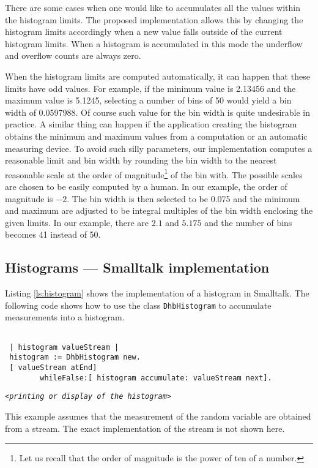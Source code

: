 \documentclass[twoside]{book}
\begin{document}
There are some cases when one would like to accumulates all the
values within the histogram limits. The proposed implementation
allows this by changing the histogram limits accordingly when a
new value falls outside of the current histogram limits. When a
histogram is accumulated in this mode the underflow and overflow
counts are always zero.

When the histogram limits are computed automatically, it can
happen that these limits have odd values. For example, if the
minimum value is 2.13456 and the maximum value is 5.1245,
selecting a number of bins of 50 would yield a bin width of
0.0597988. Of course such value for the bin width is quite
undesirable in practice. A similar thing can happen if the
application creating the histogram obtains the minimum and maximum
values from a computation or an automatic measuring device. To
avoid such silly parameters, our implementation computes a
reasonable limit and bin width by rounding the bin width to the
nearest reasonable scale at the order of magnitude\footnote{Let us
recall that the order of magnitude is the power of ten of a
number.} of the bin with. The possible scales are chosen to be
easily computed by a human. In our example, the order of magnitude
is $-2$. The bin width is then selected to be 0.075 and the
minimum and maximum are adjusted to be integral multiples of the
bin width enclosing the given limits. In our example, there are
$2.1$ and $5.175$ and the number of bins becomes 41 instead of 50.

\subsection{Histograms --- Smalltalk implementation}
\label{sec:shistogram} Listing \ref{ls:histogram} shows the
implementation of a histogram in Smalltalk. The following code
shows how to use the class {\tt DhbHistogram} to accumulate
measurements into a histogram.
\begin{codeExample}
\begin{verbatim}

 | histogram valueStream |
 histogram := DhbHistogram new.
 [ valueStream atEnd]
        whileFalse:[ histogram accumulate: valueStream next].
\end{verbatim}
\hfil {\tt<\sl printing or display of the histogram\tt >}\hfil
\end{codeExample}
This example assumes that the measurement of the random variable
are obtained from a stream. The exact implementation of the stream
is not shown here.
\end{document}
